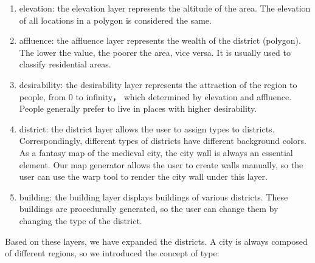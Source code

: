 \begin{enumerate}
  \item elevation: the elevation layer represents the altitude of the area. The elevation of all locations in a polygon is considered the same.
  \item affluence: the affluence layer represents the wealth of the district (polygon). The lower the value, the poorer the area, vice versa. It is usually used to classify residential areas.
  \item desirability: the desirability layer represents the attraction of the region to people, from 0 to infinity， which determined by elevation and affluence. People generally prefer to live in places with higher desirability.
  \item district: the district layer allows the user to assign types to districts. Correspondingly, different types of districts have different background colors. As a fantasy map of the medieval city, the city wall is always an essential element. Our map generator allows the user to create walls manually, so the user can use the warp tool to render the city wall under this layer.
  \item building: the building layer displays buildings of various districts. These buildings are procedurally generated, so the user can change them by changing the type of the district.
\end{enumerate}

Based on these layers, we have expanded the districts. A city is always composed of different regions, so we introduced the concept of type:


